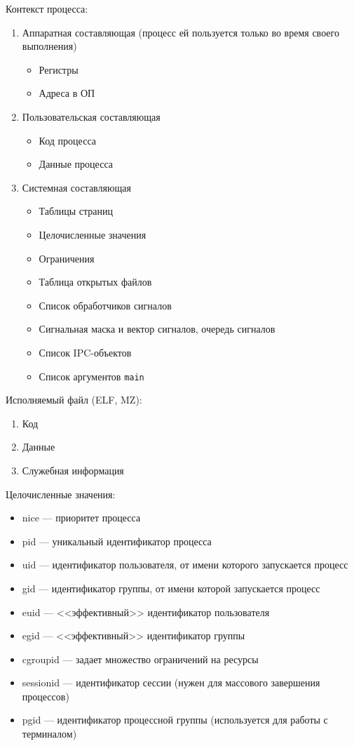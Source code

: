 Контекст процесса:
\begin{enumerate}
\item Аппаратная составляющая (процесс ей пользуется только во время своего выполнения)
\begin{itemize}
\item Регистры
\item Адреса в ОП
\end{itemize}
\item Пользовательская составляющая
\begin{itemize}
\item Код процесса
\item Данные процесса
\end{itemize}
\item Системная составляющая
\begin{itemize}
\item Таблицы страниц
\item Целочисленные значения
\item Ограничения
\item Таблица открытых файлов
\item Список обработчиков сигналов
\item Сигнальная маска и вектор сигналов, очередь сигналов
\item Список IPC-объектов
\item Список аргументов \verb!main!
\end{itemize}
\end{enumerate}

Исполняемый файл (ELF, MZ):
\begin{enumerate}
\item Код
\item Данные
\item Служебная информация
\end{enumerate}


Целочисленные значения:
\begin{itemize}
\item nice --- приоритет процесса
\item pid --- уникальный идентификатор процесса
\item uid --- идентификатор пользователя, от имени которого запускается процесс
\item gid --- идентификатор группы, от имени которой запускается процесс
\item euid --- <<эффективный>> идентификатор пользователя
\item egid --- <<эффективный>> идентификатор группы
\item cgroupid --- задает множество ограничений на ресурсы
\item sessionid --- идентификатор сессии (нужен для массового завершения процессов)
\item pgid --- идентификатор процессной группы (используется для работы с терминалом)
\end{itemize}

